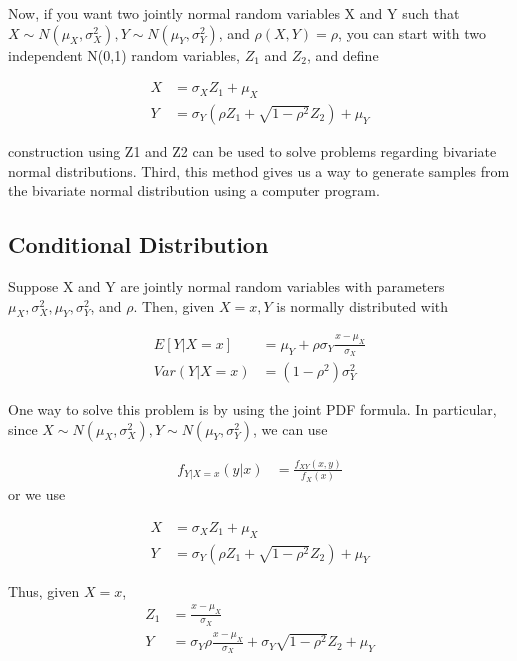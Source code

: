\documentclass[11pt]{article} %
\begin{document}
Now, if you want two jointly normal random variables X and Y such that $X \sim N(\mu_X, \sigma^2_X), Y \sim N(\mu_Y, \sigma^2_Y)$, and $\rho(X,Y)= \rho$, you can start with two independent N(0,1) random variables, $Z_1$ and $Z_2$, and define

\begin{align*}
	X &= \sigma_X Z_1 + \mu_X \\
	Y &= \sigma_Y \left(\rho Z_1 + \sqrt{1-\rho^2} Z_2 \right)  + \mu_Y
\end{align*}

construction using Z1 and Z2 can be used to solve problems regarding bivariate normal distributions. Third, this method gives us a way to generate samples from the bivariate normal distribution using a computer program. 

\subsection{Conditional Distribution}

Suppose X and Y are jointly normal random variables with parameters $\mu_X, \sigma^2_X, \mu_Y, \sigma^2_Y$, and $ \rho $. Then, given $X=x, Y$ is normally distributed with

\begin{align*}
	E[Y|X=x] &= \mu_Y + \rho \sigma_Y \frac{x-\mu_X}{\sigma_X} \\
	Var(Y|X=x) &= (1- \rho^2) \sigma^2_Y
\end{align*}

One way to solve this problem is by using the joint PDF formula. In particular, since $X \sim N(\mu_X, \sigma^2_X), Y \sim N(\mu_Y, \sigma^2_Y)$, we can use

\begin{align*}
	f_{Y|X=x} (y|x) &= \frac{f_{XY} (x, y)}{f_X(x)}
\end{align*}
or we use

\begin{align*}
	X &= \sigma_X Z_1 + \mu_X \\
	Y &= \sigma_Y \left(\rho Z_1 + \sqrt{1-\rho^2} Z_2 \right)  + \mu_Y
\end{align*}

Thus, given $X=x$, 
\begin{align*}
	Z_1 &= \frac{x - \mu_X}{\sigma_X} \\
	Y &= \sigma_Y \rho \frac{x- \mu_X}{\sigma_X} + \sigma_Y \sqrt{1- \rho^2} Z_2 + \mu_Y 
\end{align*}
\end{document}
